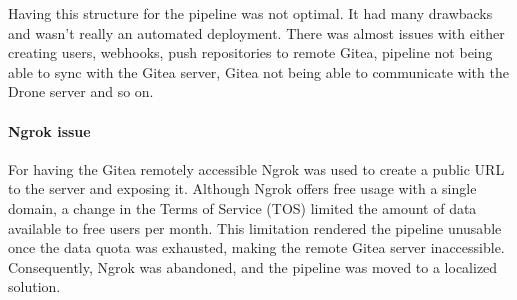 Having this structure for the pipeline was not optimal. It had many 
drawbacks and wasn't really an automated deployment. There was almost issues with either 
creating users, webhooks, push repositories to remote Gitea, pipeline not being able to sync with the Gitea server,
Gitea not being able to communicate with the Drone server and so on.
\paragraph{Ngrok issue}
For having the Gitea remotely accessible Ngrok was used to create a public \ac{URL} to the 
server and exposing it. Although Ngrok offers free usage with a single domain, a change in the Terms of Service (TOS) 
limited the amount of data available to free users per month. This limitation rendered the pipeline unusable once 
the data quota was exhausted, making the remote Gitea server inaccessible. 
Consequently, Ngrok was abandoned, and the pipeline was moved to a localized solution.


